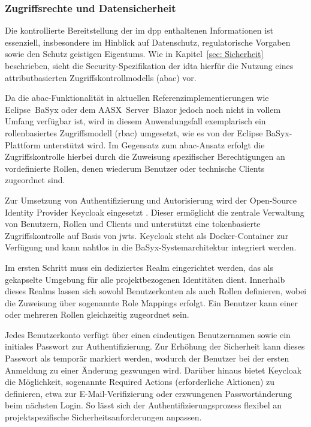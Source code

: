 \subsubsection{Zugriffsrechte und Datensicherheit}

Die kontrollierte Bereitstellung der im \acs{dpp} enthaltenen Informationen ist essenziell, insbesondere im Hinblick auf Datenschutz, regulatorische Vorgaben sowie den Schutz geistigen Eigentums.  
Wie in Kapitel~\ref{sec: Sicherheit} beschrieben, sieht die Security-Spezifikation der \acs{idta} hierfür die Nutzung eines attributbasierten Zugriffskontrollmodells (\acs{abac}) vor.

Da die \acs{abac}-Funktionalität in aktuellen Referenzimplementierungen wie \mbox{Eclipse BaSyx} oder dem \mbox{AASX Server Blazor} jedoch noch nicht in vollem Umfang verfügbar ist, wird in diesem Anwendungsfall exemplarisch ein rollenbasiertes Zugriffsmodell (\acs{rbac}) umgesetzt, wie es von der Eclipse BaSyx-Plattform unterstützt wird.  
Im Gegensatz zum \acs{abac}-Ansatz erfolgt die Zugriffskontrolle hierbei durch die Zuweisung spezifischer Berechtigungen an vordefinierte Rollen, denen wiederum Benutzer oder technische Clients zugeordnet sind.

Zur Umsetzung von Authentifizierung und Autorisierung wird der Open-Source Identity Provider Keycloak eingesetzt \cite{Keycloak}.  
Dieser ermöglicht die zentrale Verwaltung von Benutzern, Rollen und Clients und unterstützt eine tokenbasierte Zugriffskontrolle auf Basis von \acsp{jwt}.  
Keycloak steht als Docker-Container zur Verfügung und kann nahtlos in die BaSyx-Systemarchitektur integriert werden.

Im ersten Schritt muss ein dediziertes Realm eingerichtet werden, das als gekapselte Umgebung für alle projektbezogenen Identitäten dient.  
Innerhalb dieses Realms lassen sich sowohl Benutzerkonten als auch Rollen definieren, wobei die Zuweisung über sogenannte Role Mappings erfolgt.  
Ein Benutzer kann einer oder mehreren Rollen gleichzeitig zugeordnet sein.

Jedes Benutzerkonto verfügt über einen eindeutigen Benutzernamen sowie ein ini\-tiales Passwort zur Authentifizierung.  
Zur Erhöhung der Sicherheit kann dieses Passwort als temporär markiert werden, wodurch der Benutzer bei der ersten Anmeldung zu einer Änderung gezwungen wird.  
Darüber hinaus bietet Keycloak die Möglichkeit, sogenannte Required Actions (erforderliche Aktionen) zu definieren, etwa zur E-Mail-Verifizierung oder erzwungenen Passwortänderung beim nächsten Login.  
So lässt sich der Authentifizierungsprozess flexibel an projektspezifische Sicherheitsanforderungen anpassen.

